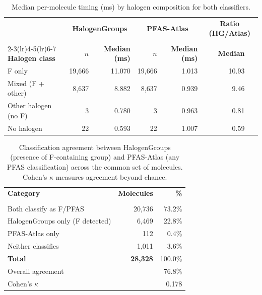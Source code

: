 \begin{table}[htbp]
\centering
\caption{Median per-molecule timing (ms) by halogen composition for both classifiers.}
\label{tab:clinventory_timing_halogen}
\begin{tabular}{lrrrrrr}
\toprule
\rowcolor[HTML]{D6E4F5} & \multicolumn{2}{c}{\textbf{HalogenGroups}} & \multicolumn{2}{c}{\textbf{PFAS-Atlas}} & \multicolumn{2}{c}{\textbf{Ratio (HG/Atlas)}} \\\\
\cmidrule(lr){2-3}\cmidrule(lr){4-5}\cmidrule(lr){6-7}
\rowcolor[HTML]{D6E4F5}\textbf{Halogen class} & \textbf{$n$} & \textbf{Median (ms)} & \textbf{$n$} & \textbf{Median (ms)} & \textbf{Median} & \\
\midrule
  \rowcolor[HTML]{FAEADE}F only & 19,666 & 11.070 & 19,666 & 1.013 & 10.93 \\
  Mixed (F + other) & 8,637 & 8.882 & 8,637 & 0.939 & 9.46 \\
  \rowcolor[HTML]{FAEADE}Other halogen (no F) & 3 & 0.780 & 3 & 0.963 & 0.81 \\
  No halogen & 22 & 0.593 & 22 & 1.007 & 0.59 \\
\bottomrule
\end{tabular}
\end{table}

\begin{table}[htbp]
\centering
\caption{Classification agreement between HalogenGroups (presence of
  F-containing group) and PFAS-Atlas (any PFAS classification) across
  the common set of molecules.  Cohen's $\kappa$ measures agreement
  beyond chance.}
\label{tab:clinventory_agreement}
\begin{tabular}{lrr}
\toprule
\rowcolor[HTML]{D6E4F5}\textbf{Category} & \textbf{Molecules} & \textbf{\%} \\\\
\midrule
  \rowcolor[HTML]{FAEADE}Both classify as F/PFAS & 20,736 & 73.2\% \\
  \rowcolor[HTML]{F2DCE9}HalogenGroups only (F detected) & 6,469 & 22.8\% \\
  \rowcolor[HTML]{D6E4F5}PFAS-Atlas only & 112 & 0.4\% \\
  Neither classifies & 1,011 & 3.6\% \\
\midrule
  \textbf{Total} & \textbf{28,328} & 100.0\% \\
\midrule
  Overall agreement & \multicolumn{2}{r}{76.8\%} \\
  Cohen's $\kappa$ & \multicolumn{2}{r}{0.178} \\
\bottomrule
\end{tabular}
\end{table}

